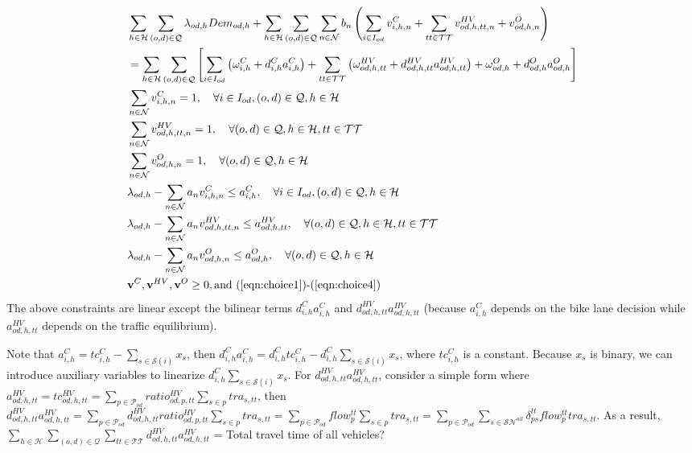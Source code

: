 \documentclass[trsc,nonblindrev]{informs3noheader}
\begin{document}
\begin{align}
    & \sum_{h\in \mathcal{H}}\sum_{(o,d)\in\mathcal{Q}} \lambda_{od,h} Dem_{od,h} + \sum_{h\in \mathcal{H}}\sum_{(o,d)\in\mathcal{Q}} \sum_{n\in\mathcal{N}} b_n\left( \sum_{i\in {I}_{od}} v_{i,h,n}^C  +  \sum_{tt \in \mathcal{TT}}  v_{od, h, tt, n}^{HV} + v_{od, h, n}^O   \right) \nonumber \\
    & = \sum_{h\in \mathcal{H}}\sum_{(o,d)\in\mathcal{Q}} \left[ \sum_{i\in {I}_{od}} \left( \omega_{i,h}^C + d_{i,h}^C a_{i,h}^C \right) + \sum_{tt \in \mathcal{TT}} \left(\omega_{od,h, tt}^{HV} + d_{od,h,tt}^{HV} a_{od,h,tt}^{HV} \right)  + \omega_{od,h}^O + d_{od,h}^Oa_{od,h}^O \right] \\
    & \sum_{n\in \mathcal{N}}  v_{i,h,n}^C = 1, \quad \forall i\in {I}_{od}, (o,d)\in\mathcal{Q}, h\in \mathcal{H} \\
    & \sum_{n\in \mathcal{N}} v_{od, h, tt, n}^{HV} = 1, \quad \forall (o,d)\in\mathcal{Q}, h\in \mathcal{H}, tt \in \mathcal{TT} \\
    & \sum_{n\in \mathcal{N}} v_{od, h, n}^O = 1, \quad \forall (o,d)\in\mathcal{Q}, h\in \mathcal{H} \\
    & \lambda_{od,h} - \sum_{n\in \mathcal{N}} a_n v_{i,h,n}^C \leq a_{i,h}^C, \quad \forall i\in {I}_{od}, (o,d)\in\mathcal{Q}, h\in \mathcal{H} \\
    & \lambda_{od,h} - \sum_{n\in \mathcal{N}} a_n v_{od, h, tt, n}^{HV} \leq a_{od, h, tt}^{HV}, \quad  \forall (o,d)\in\mathcal{Q}, h\in \mathcal{H}, tt \in \mathcal{TT} \\
    &  \lambda_{od,h} - \sum_{n\in \mathcal{N}} a_n v_{od, h, n}^O  \leq a_{od, h}^O, \quad \forall (o,d)\in\mathcal{Q}, h\in \mathcal{H}\\
    & \mathbf{v}^C, \mathbf{v}^{HV}, \mathbf{v}^O \geq 0, \text{and (\ref{eqn:choice1})-(\ref{eqn:choice4})}
\end{align}
The above constraints are linear except the bilinear terms $d_{i,h}^C a_{i,h}^C$ and  $d_{od,h,tt}^{HV} a_{od,h,tt}^{HV}$ (because $a_{i,h}^C$ depends on the bike lane decision while $a_{od,h,tt}^{HV}$ depends on the traffic equilibrium). 

Note that $a_{i,h}^C = tc_{i,h}^C - \sum_{s \in \mathcal{S}(i)} x_s$, then $d_{i,h}^C a_{i,h}^C = d_{i,h}^C tc_{i,h}^C  - d_{i,h}^C\sum_{s \in \mathcal{S}(i)} x_s$, where $tc_{i,h}^C$ is a constant. Because $x_s$ is binary, we can introduce auxiliary variables to linearize $d_{i,h}^C\sum_{s \in \mathcal{S}(i)} x_s$. For $d_{od,h,tt}^{HV} a_{od,h,tt}^{HV}$, consider a simple form where $a_{od,h,tt}^{HV} =  tc_{od,h,tt}^{HV} = \sum_{p \in \mathcal{P}_{od}} ratio_{od,p,tt}^{HV} \sum_{s\in p} tra_{s,tt} $, then $d_{od,h,tt}^{HV} a_{od,h,tt}^{HV} = \sum_{p \in \mathcal{P}_{od}} d_{od,h,tt}^{HV} ratio_{od,p,tt}^{HV} \sum_{s\in p} tra_{s,tt} =  \sum_{p \in \mathcal{P}_{od}} flow_p^{tt} \sum_{s\in p} tra_{s,tt} = \sum_{p \in \mathcal{P}_{od}} \sum_{s\in \mathcal{SN}^{all}} \delta_{ps}^{tt} flow_p^{tt} tra_{s,tt}$. As a result, $\sum_{h\in \mathcal{H}}\sum_{(o,d)\in\mathcal{Q}} \sum_{tt \in \mathcal{TT}} d_{od,h,tt}^{HV} a_{od,h,tt}^{HV}$ = Total travel time of all vehicles? 
\end{document}
